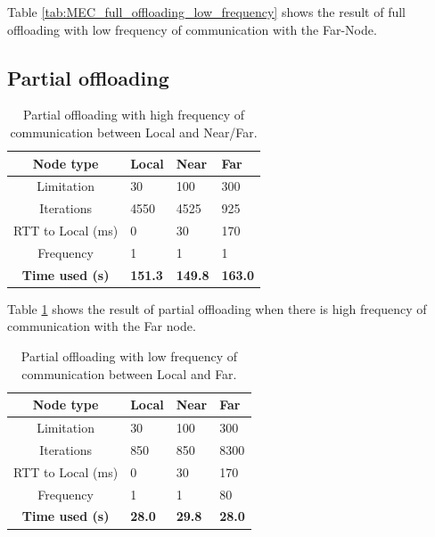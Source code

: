 Table \ref{tab:MEC_full_offloading_low_frequency} shows the result of full offloading with low frequency of communication with the Far-Node.






\subsection{Partial offloading}


\begin{table}[h!]
    \centering
    \begin{tabular}[c]{|c||p{2cm}|p{2cm}|p{2cm}|}
        \hline
        Node type & Local & Near & Far \\
        \hline
        Limitation          & 30 & 100 & 300  \\
        \hline
        Iterations          & 4550 & 4525 & 925  \\
        \hline
        RTT to Local (ms)   & 0 & 30 & 170 \\
        \hline
        Frequency           & 1 & 1 & 1 \\
        \hline
        \hline
        \hline
        \textbf{Time used (s)}       & \textbf{151.3} & \textbf{149.8} & \textbf{163.0} \\
        \hline
    \end{tabular}
    \caption{Partial offloading with high frequency of communication between Local and Near/Far.}
    \label{tab:MEC_partial_offloading_high_frequency}
\end{table}

Table \ref{tab:MEC_partial_offloading_high_frequency} shows the result of partial offloading when there is high frequency of communication with the Far node.


\begin{table}[h!]
    \centering
    \begin{tabular}[c]{|c||p{2cm}|p{2cm}|p{2cm}|}
        \hline
        Node type & Local & Near & Far \\
        \hline
        Limitation          & 30 & 100 & 300  \\
        \hline
        Iterations          & 850 & 850 & 8300  \\
        \hline
        RTT to Local (ms)   & 0 & 30 & 170 \\
        \hline
        Frequency           & 1 & 1 & 80 \\
        \hline
        \hline
        \hline
        \textbf{Time used (s)}       & \textbf{28.0} & \textbf{29.8} & \textbf{28.0} \\
        \hline
    \end{tabular}
    \caption{Partial offloading with low frequency of communication between Local and Far.}
    \label{tab:MEC_partial_offloading_low_frequency}
\end{table}

